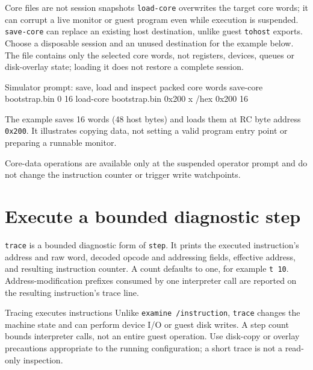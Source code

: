 \begin{operationnote}{Core files are not session snapshots}
\passthrough{\lstinline!load-core!} overwrites the target core words; it can corrupt a live monitor or guest program even while execution is suspended. \passthrough{\lstinline!save-core!} can replace an existing host destination, unlike guest \passthrough{\lstinline!tohost!} exports. Choose a disposable session and an unused destination for the example below. The file contains only the selected core words, not registers, devices, queues or disk-overlay state; loading it does not restore a complete session.
\end{operationnote}

\begin{commandexample}{Simulator prompt: save, load and inspect packed core words}
save-core bootstrap.bin 0 16
load-core bootstrap.bin 0x200
x /hex 0x200 16
\end{commandexample}

The example saves 16 words (48 host bytes) and loads them at RC byte address \passthrough{\lstinline!0x200!}. It illustrates copying data, not setting a valid program entry point or preparing a runnable monitor.

Core-data operations are available only at the suspended operator prompt and do not change the instruction counter or trigger write watchpoints.

\section{Execute a bounded diagnostic step}\label{execute-a-bounded-diagnostic-step}

\passthrough{\lstinline!trace!} is a bounded diagnostic form of \passthrough{\lstinline!step!}. It prints the executed instruction's address and raw word, decoded opcode and addressing fields, effective address, and resulting instruction counter. A count defaults to one, for example \passthrough{\lstinline!t 10!}. Address-modification prefixes consumed by one interpreter call are reported on the resulting instruction's trace line.

\begin{operationnote}{Tracing executes instructions}
Unlike \passthrough{\lstinline!examine /instruction!}, \passthrough{\lstinline!trace!} changes the machine state and can perform device I/O or guest disk writes. A step count bounds interpreter calls, not an entire guest operation. Use disk-copy or overlay precautions appropriate to the running configuration; a short trace is not a read-only inspection.
\end{operationnote}
